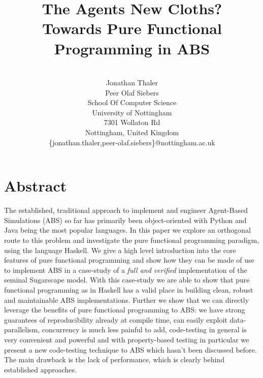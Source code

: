 \documentclass{scspaperproc}
\begin{document}


\title{The Agents New Cloths? \\ \small{Towards Pure Functional Programming in ABS}}

\author{
\\%
Jonathan Thaler \\ 
Peer Olaf Siebers \\ [12pt] 
School Of Computer Science \\
University of Nottingham \\
7301 Wollaton Rd \\
Nottingham, United Kingdom \\
\{jonathan.thaler,peer-olaf.siebers\}@nottingham.ac.uk\\
}

\maketitle

\section*{Abstract}
The established, traditional approach to implement and engineer Agent-Based Simulations (ABS) so far has primarily been object-oriented with Python and Java being the most popular languages. In this paper we explore an orthogonal route to this problem and investigate the pure functional programming paradigm, using the language Haskell. We give a high level introduction into the core features of pure functional programming and show how they can be made of use to implement ABS in a case-study of a \textit{full and verified} implementation of the seminal Sugarscape model. With this case-study we are able to show that pure functional programming as in Haskell has a valid place in building clean, robust and maintainable ABS implementations. \newline
Further we show that we can directly leverage the benefits of pure functional programming to ABS: we have strong guarantees of reproducibility already at compile time, can easily exploit data-parallelism, concurrency is much less painful to add, code-testing in general is very convenient and powerful and with property-based testing in particular we present a new code-testing technique to ABS which hasn't been discussed before. The main drawback is the lack of performance, which is clearly behind established approaches.
\end{document}
